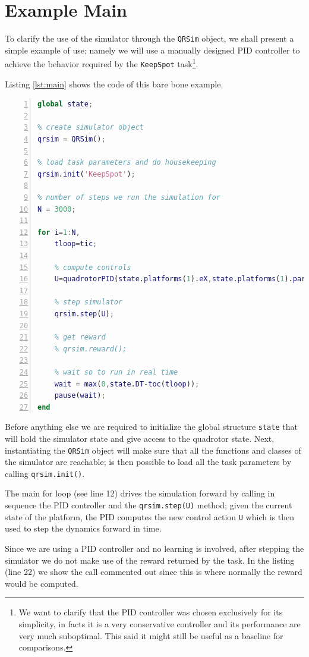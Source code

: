 \documentclass[a4paper,11pt]{report}
\newcommand{\snamettt}{\texttt{QRSim}\xspace}
\begin{document}
\section{Example Main}
To clarify the use of the simulator through the \snamettt object, we shall present a simple example of use; namely we will use a manually designed PID controller to achieve the behavior required by the \texttt{KeepSpot} task\footnote{We want to clarify that the PID controller was chosen exclusively for its simplicity, in facts it is a very conservative controller and its performance are very much suboptimal. This said it might still be useful as a baseline for comparisons.}.

Listing \ref{lst:main} shows the code of this bare bone example. 

\begin{lstlisting}[float=ht!bp,caption=main script,language=Matlab,frame=lines,label=lst:main,numbers=left,basicstyle=\small]
global state;

% create simulator object
qrsim = QRSim();

% load task parameters and do housekeeping
qrsim.init('KeepSpot');

% number of steps we run the simulation for
N = 3000;

for i=1:N,
    tloop=tic;    

    % compute controls
    U=quadrotorPID(state.platforms(1).eX,state.platforms(1).params.X(1:3));
    
    % step simulator 
    qrsim.step(U);

    % get reward
    % qrsim.reward();

    % wait so to run in real time
    wait = max(0,state.DT-toc(tloop));   
    pause(wait);    
end
\end{lstlisting}
Before anything else we are required to initialize the global structure \texttt{state} that will hold the simulator state and give access to the quadrotor state. Next, instantiating the \snamettt object will make sure that all the functions and classes of the simulator are reachable; is then possible to load all the task parameters by calling \texttt{qrsim.init()}. 

The main for loop (see line 12) drives the simulation forward by calling in sequence the PID controller and the \texttt{qrsim.step(U)} method; given the current state of the platform, the PID computes the new control action  \texttt{U} which is then used to step the dynamics forward in time.

Since we are using a PID controller and no learning is involved, after stepping the simulator we do not make use of the reward returned by the task. In the listing (line 22) we show the call commented out since this is where normally the reward would be computed.
\end{document}
